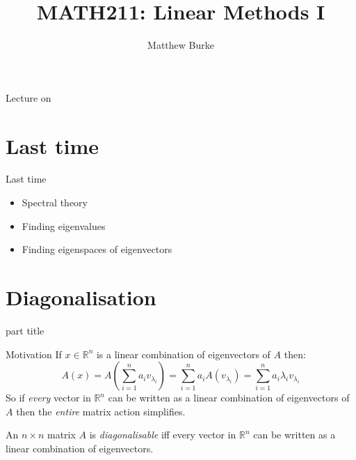 \documentclass{beamer}
\title{MATH211: Linear Methods I}
\author{Matthew Burke}
\date{\lectureDate}
\newcommand{\lectureDate}{\formatdate{29}{11}{2018}}
\begin{document}
\frame{\titlepage}

\begin{frame}{Lecture on \lectureDate}
  \tableofcontents
\end{frame}

\section*{Last time}
\label{sec:Last-time}

\begin{frame}{Last time}
	\begin{itemize}
		\item Spectral theory\vfill
		\item Finding eigenvalues\vfill
		\item Finding eigenspaces of eigenvectors
	\end{itemize}
\end{frame}

\section{Diagonalisation}

\begin{frame}
\begin{beamercolorbox}[sep=12pt,center]{part title}
\insertsection\par
\end{beamercolorbox}
\end{frame}

\begin{frame}{Motivation}
If $x\in \mathbb{R}^n$ is a linear combination of eigenvectors of $A$ then:
\begin{equation*}
	A(x) = A\left(\sum_{i=1}^n a_i v_{\lambda_i}\right) = \sum_{i=1}^n a_iA(v_{\lambda_i}) = \sum_{i=1}^n a_i\lambda_iv_{\lambda_i}
\end{equation*}
So if \emph{every} vector in $\mathbb{R}^n$ can be written as a linear combination of eigenvectors of $A$ then the \emph{entire} matrix action simplifies.\vfill
\begin{definition}
	An $n\times n$ matrix $A$ is \emph{diagonalisable} iff every vector in $\mathbb{R}^n$ can be written as a linear combination of eigenvectors.
\end{definition}
\end{frame}
\end{document}
